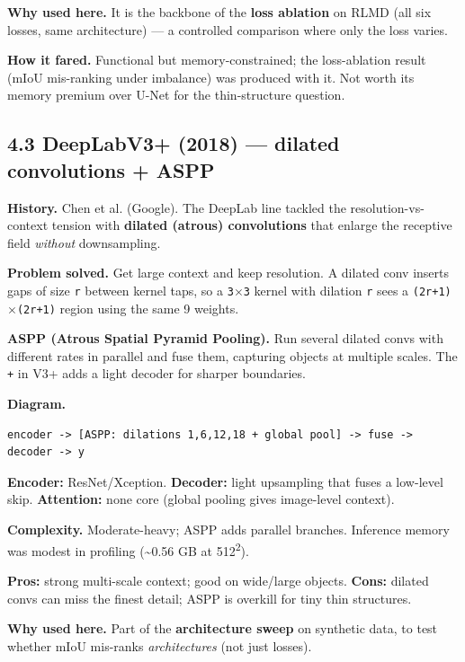 \documentclass[11pt]{article}
\begin{document}
\textbf{Why used here.} It is the backbone of the \textbf{loss ablation} on RLMD (all six losses, same architecture) --- a controlled comparison where only the loss varies.

\textbf{How it fared.} Functional but memory-constrained; the loss-ablation result (mIoU mis-ranking under imbalance) was produced with it. Not worth its memory premium over U-Net for the thin-structure question.

\subsection*{4.3 DeepLabV3+ (2018) --- dilated convolutions + ASPP}

\textbf{History.} Chen et al. (Google). The DeepLab line tackled the resolution-vs-context tension with \textbf{dilated (atrous) convolutions} that enlarge the receptive field \textit{without} downsampling.

\textbf{Problem solved.} Get large context and keep resolution. A dilated conv inserts gaps of size \texttt{r} between kernel taps, so a \texttt{3$\times$3} kernel with dilation \texttt{r} sees a \texttt{(2r+1)$\times$(2r+1)} region using the same 9 weights.

\textbf{ASPP (Atrous Spatial Pyramid Pooling).} Run several dilated convs with different rates in parallel and fuse them, capturing objects at multiple scales. The \texttt{+} in V3+ adds a light decoder for sharper boundaries.

\textbf{Diagram.}
\begin{Verbatim}[breaklines=true,breakanywhere=true,fontsize=\footnotesize]
  encoder -> [ASPP: dilations 1,6,12,18 + global pool] -> fuse -> decoder -> y
\end{Verbatim}

\textbf{Encoder:} ResNet/Xception. \textbf{Decoder:} light upsampling that fuses a low-level skip. \textbf{Attention:} none core (global pooling gives image-level context).

\textbf{Complexity.} Moderate-heavy; ASPP adds parallel branches. Inference memory was modest in profiling (\textasciitilde{}0.56 GB at 512\textsuperscript{2}).

\textbf{Pros:} strong multi-scale context; good on wide/large objects. \textbf{Cons:} dilated convs can miss the finest detail; ASPP is overkill for tiny thin structures.

\textbf{Why used here.} Part of the \textbf{architecture sweep} on synthetic data, to test whether mIoU mis-ranks \textit{architectures} (not just losses).
\end{document}
